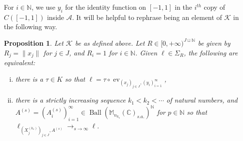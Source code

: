\documentclass[10pt]{amsart}
\newtheorem{prop}[thm]{Proposition}
\theoremstyle{definition}
\numberwithin{equation}{section}
\newcommand{\bC}{{\mathbb C}}
\newcommand{\bM}{{\mathbb M}}
\newcommand{\bN}{{\mathbb N}}
\newcommand{\cA}{{\mathcal A}}
\newcommand{\cK}{{\mathcal K}}
\DeclareMathOperator{\ev}{ev}
\DeclareMathOperator{\Ball}{Ball}
\begin{document}
For $i\in\bN$, we use $y_{i}$ for the identity function on $[-1,1]$ in the $i^{th}$ copy of $C([-1,1])$ inside $\cA$. 
It will be helpful to rephrase being an element of $\cK$ in the following way.

\begin{prop}\label{prop: usual diagaonl stuff}
Let $\cK$ be as defined above. Let $R\in [0,+\infty)^{J\sqcup \bN}$ be given by $R_{j}=\|x_{j}\|$ for $j\in J$, and $R_{i}=1$ for $i\in \bN$. 
Given $\ell\in \Sigma_{R}$, the following are equivalent:
\begin{enumerate}[(i)]
\item there is a $\tau\in K$ so that $\ell=\tau\circ \ev_{(x_{j})_{j\in J},(y_{i})_{i=1}^{\infty}}$, \label{item: ultraproduct reformulation trace}
\item there is a strictly increasing sequence $k_{1}<k_{2}<\cdots$ of natural numbers, and $A^{(s)}=(A_{i}^{(s)})_{i=1}^{\infty}\in \Ball(\bM_{n_{k_{s}}}(\bC)_{s.a.})^{\bN}$ for $p\in \bN$ so that $\ell_{(X^{(k_{s})}_{j})_{j\in J},A^{(s)}}\to_{s\to\infty} \ell$.
\label{item: sequential refomrulation trace}
\end{enumerate}

\end{prop}
\end{document}
